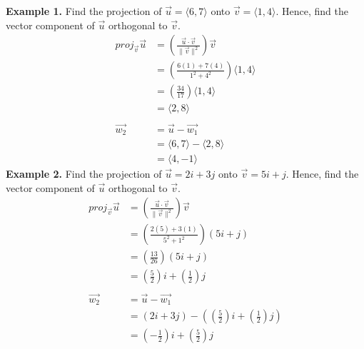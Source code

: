 \documentclass{report}
\begin{document}
\noindent\textbf{Example 1. } Find the projection of $\vec{u} = \langle 6, 7 \rangle$ onto $\vec{v} = \langle 1, 4 \rangle$. Hence, find the vector component of $\vec{u}$ orthogonal to $\vec{v}$.
\begin{align*}
    proj_{\vec{v}}\vec{u} & = \left(\frac{\vec{u} \cdot \vec{v}}{\lVert \vec{v} \rVert^2}\right)\vec{v} \\
                          & = \left(\frac{6(1) + 7(4)}{1^2 + 4^2}\right)\langle 1, 4 \rangle            \\
                          & = \left(\frac{34}{17}\right)\langle 1, 4 \rangle                            \\
                          & = \langle 2, 8 \rangle                                                      \\
    \\
    \vec{w_2}             & = \vec{u} - \vec{w_1}                                                       \\
                          & = \langle 6, 7 \rangle - \langle 2, 8 \rangle                               \\
                          & = \langle 4, -1 \rangle
\end{align*}
\noindent\textbf{Example 2. } Find the projection of $\vec{u} = 2i + 3j$ onto $\vec{v} = 5i + j$. Hence, find the vector component of $\vec{u}$ orthogonal to $\vec{v}$.
\begin{align*}
    proj_{\vec{v}}\vec{u} & = \left(\frac{\vec{u} \cdot \vec{v}}{\lVert \vec{v} \rVert^2}\right)\vec{v}      \\
                          & = \left(\frac{2(5) + 3(1)}{5^2 + 1^2}\right)(5i + j)                             \\
                          & = \left(\frac{13}{26}\right)(5i + j)                                             \\
                          & = \left(\frac{5}{2}\right)i + \left(\frac{1}{2}\right)j                          \\
    \\
    \vec{w_2}             & = \vec{u} - \vec{w_1}                                                            \\
                          & = (2i + 3j) - \left(\left(\frac{5}{2}\right)i + \left(\frac{1}{2}\right)j\right) \\
                          & = \left(-\frac{1}{2}\right)i + \left(\frac{5}{2}\right)j
\end{align*}
\end{document}
